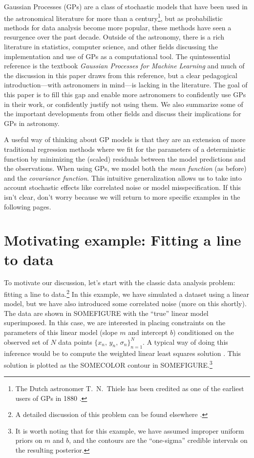 \documentclass[modern, letterpaper]{aastex61}
\begin{document}
Gaussian Processes (GPs) are a class of stochastic models that have been used
in the astronomical literature for more than a century\footnote{The Dutch
astronomer T.~N.~Thiele has been credited as one of the earliest users of
GPs in 1880 \citep{Lauritzen:1981}.}, but as probabilistic methods for data
analysis become more popular, these methods have seen a resurgence over the
past decade.
Outside of the astronomy, there is a rich literature in statistics, computer
science, and other fields discussing the implementation and use of GPs as a
computational tool.
The quintessential reference is the textbook \emph{Gaussian Processes for
Machine Learning} \citep{Rasmussen:2006} and much of the discussion in this
paper draws from this reference, but a clear pedagogical introduction---with
astronomers in mind---is lacking in the literature.
The goal of this paper is to fill this gap and enable more astronomers to
confidently use GPs in their work, or confidently justify not using them.
We also summarize some of the important developments from other fields and
discuss their implications for GPs in astronomy.

A useful way of thinking about GP models is that they are an extension of more
traditional regression methods where we fit for the parameters of a
deterministic function by minimizing the (scaled) residuals between the model
predictions and the observations.
When using GPs, we model both the \emph{mean function} (as before) and the
\emph{covariance function}.
This intuitive generalization allows us to take into account stochastic
effects like correlated noise or model misspecification.
If this isn't clear, don't worry because we will return to more specific
examples in the following pages.

\section{Motivating example: Fitting a line to data}

To motivate our discussion, let's start with the classic data analysis
problem: fitting a line to data.\footnote{A detailed discussion of this
problem can be found elsewhere \citep{Hogg:2010}.}
In this example, we have simulated a dataset using a linear model, but we have
also introduced some correlated noise (more on this shortly).
The data are shown in SOMEFIGURE with the ``true'' linear model superimposed.
In this case, we are interested in placing constraints on the parameters of
this linear model (slope $m$ and intercept $b$) conditioned on the observed
set of $N$ data points ${\{x_n,\,y_n,\,\sigma_n\}}_{n=1}^N$.
A typical way of doing this inference would be to compute the weighted linear
least squares solution \citep[see][for example]{Hogg:2010,Ivezic:2014}.
This solution is plotted as the SOMECOLOR contour in SOMEFIGURE.\footnote{It
is worth noting that for this example, we have assumed improper uniform priors
on $m$ and $b$, and the contours are the ``one-sigma'' credible intervals on
the resulting posterior.}
\end{document}
